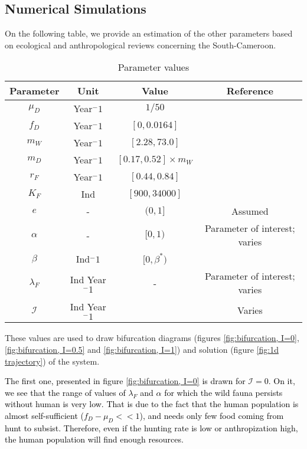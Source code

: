 \documentclass{article}
\newcommand{\lfw}{\lambda_{F}}
\newcommand{\lfw}{\lambda_{F}}
\newcommand{\cI}{\mathcal{I}}
\newcommand{\vdeux}[1]{\textcolor{black}{#1}}
\theoremstyle{definition}
\theoremstyle{remark}
\begin{document}
\subsection{Numerical Simulations}
On the following table, we provide an estimation of the other parameters based on ecological and anthropological reviews concerning the South-Cameroon.

\begin{table}[ht]
\centering
\begin{tabular}{|c|c|c|c|}
\hline 
Parameter & Unit & Value & Reference \\ 
\hline 
$\mu_D$ & Year$^-1$  & $1/50$ & \cite{ins_demographie}\\
$f_D$ & Year$^-1$ &$[0, 0.0164]$ & \cite{koppert_consommation_1996}\\
$m_W$ &Year$^-1$  &$[2.28, 73.0]$ & \cite{duda_hunting_2017, avila_interpreting_2019}\\
$m_D$ & Year$^-1$  &$[0.17, 0.52] \times m_W$ & \cite{avila_interpreting_2019}\\
$r_F$ & Year$^-1$ & $[0.44, 0.84]$ & \cite{duda_hunting_2017, robinson_intrinsic_1986}\\
$K_F$ & Ind& $[900, 34000]$ & \cite{janson_ecological_1990} \\
$e$ & - & $(0, 1]$ & Assumed\\
$\alpha$ &-&  $[0, 1)$ & Parameter of interest; varies \\
$\beta$ & Ind$^-1$ & $[0, \beta^*)$ &  \\
$\lfw$ & Ind Year$^-1$ & - & Parameter of interest; varies \\
$\mathcal{I}$ &  Ind Year$^-1$ & & Varies \\
\hline
\end{tabular}
\caption{Parameter values}
\label{table:param values}
\end{table}

These values are used to draw bifurcation diagrams (figures \ref{fig:bifurcation, I=0}, \ref{fig:bifurcation, I=0.5} and \ref{fig:bifurcation, I=1}) and solution (figure \ref{fig:1d trajectory}) of the system.

\vdeux{
The first one, presented in figure \ref{fig:bifurcation, I=0} is drawn for $\cI = 0$. On it, we see that the range of values of $\lfw$ and $\alpha$ for which the wild fauna persists without human is very low. That is due to the fact that the human population is almost self-sufficient ($f_D - \mu_D << 1$), and needs only few food coming from hunt to subsist. Therefore, even if the hunting rate is low or anthropization high, the human population will find enough resources. 
}
\end{document}
